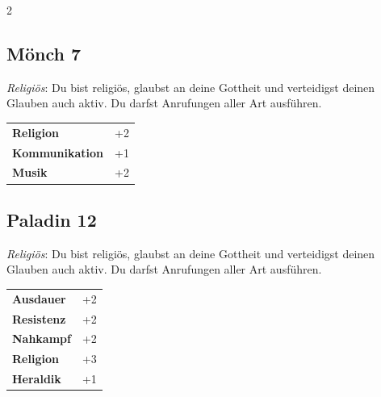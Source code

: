\begin{multicols}{2}
\begin{tcolorbox}

\end{tcolorbox}

\begin{tcolorbox}
    \subsection*{Mönch \hfill \small{7 }}
    \tcblower
\textit{Religiös}: Du bist religiös, glaubst an deine Gottheit und verteidigst deinen Glauben auch aktiv. Du darfst Anrufungen aller Art ausführen.


\vspace{3mm}

\begin{tabular}{@{}ll@{}}
    \textbf{Religion} & +2\\
    \textbf{Kommunikation} & +1\\
    \textbf{Musik} & +2\\
\end{tabular}


\end{tcolorbox}

\begin{tcolorbox}
    \subsection*{Paladin \hfill \small{12 }}
    \tcblower
\textit{Religiös}: Du bist religiös, glaubst an deine Gottheit und verteidigst deinen Glauben auch aktiv. Du darfst Anrufungen aller Art ausführen.


\vspace{3mm}

\begin{tabular}{@{}ll@{}}
    \textbf{Ausdauer} & +2\\
    \textbf{Resistenz} & +2\\
    \textbf{Nahkampf} & +2\\
    \textbf{Religion} & +3\\
    \textbf{Heraldik} & +1\\
\end{tabular}


\end{tcolorbox}
\end{multicols}
